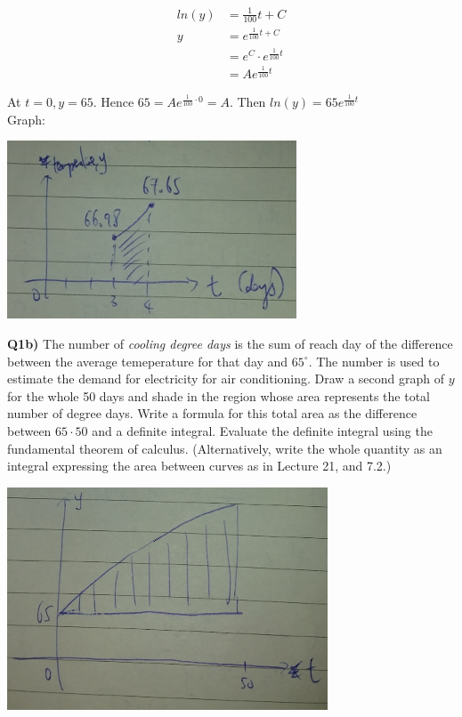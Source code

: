 \documentclass[9pt]{article}
\begin{document}
\begin{align*}
  ln(y) &= \frac{1}{100}t + C \\
  y &= e^{\frac{1}{100}t + C} \\
  &= e^{C} \cdot e^{\frac{1}{100}t} \\
  &= Ae^{\frac{1}{100}t}
\end{align*}

At $t = 0, y = 65$. Hence $65 = Ae^{\frac{1}{100} \cdot 0} = A$. Then $ln(y) = 65e^{\frac{1}{100}t}$ \\

Graph:

\begin{center}
  \includegraphics{q1a.jpg}
\end{center}

\begin{tcolorbox}
  \textbf{Q1b)} The number of \emph{cooling degree days} is the sum of reach day of the difference between the average temeperature for that day and $65^{\circ}$. The number is used to estimate the demand for electricity for air conditioning. Draw a second graph of $y$ for the whole 50 days and shade in the region whose area represents the total number of degree days. Write a formula for this total area as the difference between $65 \cdot 50$ and a definite integral. Evaluate the definite integral using the fundamental theorem of calculus. (Alternatively, write the whole quantity as an integral expressing the area between curves as in Lecture 21, and 7.2.)
\end{tcolorbox}

\begin{center}
  \includegraphics{q1b.jpg}
\end{center}
\end{document}
